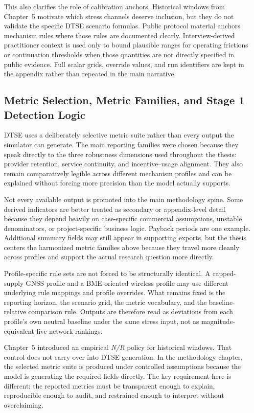 This also clarifies the role of calibration anchors. Historical windows from Chapter~5 motivate which stress channels deserve inclusion, but they do not validate the specific DTSE scenario formulas. Public protocol material anchors mechanism rules where those rules are documented clearly. Interview-derived practitioner context is used only to bound plausible ranges for operating frictions or continuation thresholds when those quantities are not directly specified in public evidence. Full scalar grids, override values, and run identifiers are kept in the appendix rather than repeated in the main narrative.

\subsection{Metric Selection, Metric Families, and Stage 1 Detection Logic}
\label{sec:evaluation_metrics}
DTSE uses a deliberately selective metric suite rather than every output the simulator can generate. The main reporting families were chosen because they speak directly to the three robustness dimensions used throughout the thesis: provider retention, service continuity, and incentive--usage alignment. They also remain comparatively legible across different mechanism profiles and can be explained without forcing more precision than the model actually supports.

Not every available output is promoted into the main methodology spine. Some derived indicators are better treated as secondary or appendix-level detail because they depend heavily on case-specific commercial assumptions, unstable denominators, or project-specific business logic. Payback periods are one example. Additional summary fields may still appear in supporting exports, but the thesis centers the harmonized metric families above because they travel more cleanly across profiles and support the actual research question more directly.

Profile-specific rule sets are not forced to be structurally identical. A capped-supply GNSS profile and a BME-oriented wireless profile may use different underlying rule mappings and profile overrides. What remains fixed is the reporting horizon, the scenario grid, the metric vocabulary, and the baseline-relative comparison rule. Outputs are therefore read as deviations from each profile's own neutral baseline under the same stress input, not as magnitude-equivalent live-network rankings.

Chapter~5 introduced an empirical \emph{N/R} policy for historical windows. That control does not carry over into DTSE generation. In the methodology chapter, the selected metric suite is produced under controlled assumptions because the model is generating the required fields directly. The key requirement here is different: the reported metrics must be transparent enough to explain, reproducible enough to audit, and restrained enough to interpret without overclaiming.

